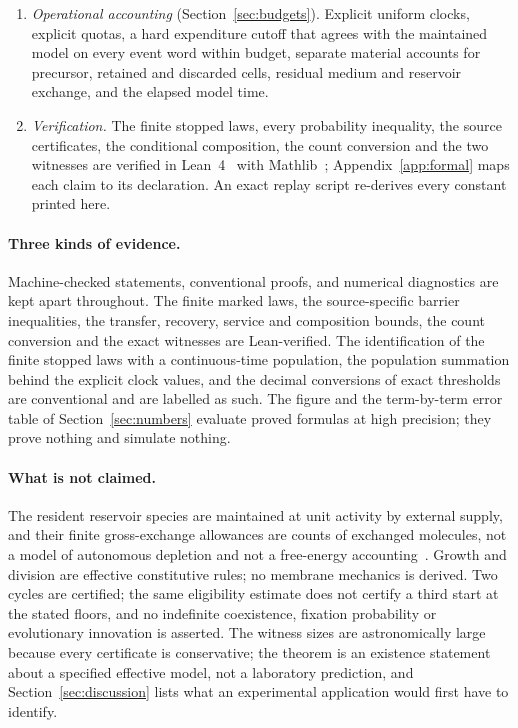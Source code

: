 \documentclass[11pt,a4paper]{article}
\theoremstyle{plain}
\theoremstyle{definition}
\theoremstyle{remark}
\begin{document}
\begin{enumerate}[label=(\roman*)]
\item \emph{Operational accounting} (Section~\ref{sec:budgets}). Explicit uniform clocks, explicit quotas, a hard expenditure cutoff that agrees with the maintained model on every event word within budget, separate material accounts for precursor, retained and discarded cells, residual medium and reservoir exchange, and the elapsed model time.
\item \emph{Verification.} The finite stopped laws, every probability inequality, the source certificates, the conditional composition, the count conversion and the two witnesses are verified in Lean~4~\citep{demoura2021} with Mathlib~\citep{mathlib2020}; Appendix~\ref{app:formal} maps each claim to its declaration. An exact replay script re-derives every constant printed here.
\end{enumerate}

\paragraph{Three kinds of evidence.}
Machine-checked statements, conventional proofs, and numerical diagnostics are kept apart throughout. The finite marked laws, the source-specific barrier inequalities, the transfer, recovery, service and composition bounds, the count conversion and the exact witnesses are Lean-verified. The identification of the finite stopped laws with a continuous-time population, the population summation behind the explicit clock values, and the decimal conversions of exact thresholds are conventional and are labelled as such. The figure and the term-by-term error table of Section~\ref{sec:numbers} evaluate proved formulas at high precision; they prove nothing and simulate nothing.

\paragraph{What is not claimed.}
The resident reservoir species are maintained at unit activity by external supply, and their finite gross-exchange allowances are counts of exchanged molecules, not a model of autonomous depletion and not a free-energy accounting~\citep{polettini2014,rao2016}. Growth and division are effective constitutive rules; no membrane mechanics is derived. Two cycles are certified; the same eligibility estimate does not certify a third start at the stated floors, and no indefinite coexistence, fixation probability or evolutionary innovation is asserted. The witness sizes are astronomically large because every certificate is conservative; the theorem is an existence statement about a specified effective model, not a laboratory prediction, and Section~\ref{sec:discussion} lists what an experimental application would first have to identify.
\end{document}
